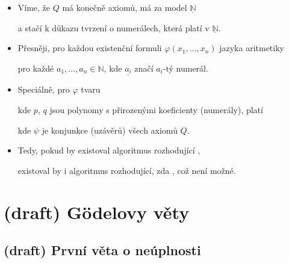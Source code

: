 \begin{itemize}
\item Víme, že  $Q$ má konečně axiomů, má za model $\underline{\mathbb{N}}$
\smallskip

a stačí k důkazu  tvrzení o numerálech, která platí v $\underline{\mathbb{N}}$.
\smallskip

\item Přesněji, pro každou existenční formuli $\varphi(x_1,\dots,x_n)$ jazyka aritmetiky



pro každé $a_1,\dots,a_n \in \mathbb{N}$, kde $\underline{a_i}$ značí $a_i$-tý numerál.
\smallskip

\item Speciálně, pro $\varphi$ tvaru 
\smallskip

kde $p$, $q$ jsou polynomy s přirozenými koeficienty (numerály), platí



kde $\psi$ je konjunkce (uzávěrů) všech axiomů $Q$.
\smallskip

\item Tedy, pokud by existoval algoritmus rozhodující ,
\smallskip

existoval by i algoritmus rozhodující, zda , což není možné.


\end{itemize}



\section{(draft) Gödelovy věty}\todo



\subsection{(draft) První věta o neúplnosti}\todo

